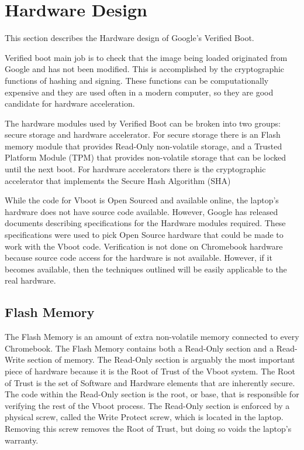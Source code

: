 \chapter{Hardware Design}

This section describes the Hardware design of Google's Verified Boot. 

Verified boot main job is to check that the image being loaded originated from
Google and has not been modified. 
This is accomplished by the cryptographic functions of hashing and signing.
These functions can be computationally expensive and they are used often in a
modern computer, so they are good candidate for hardware acceleration.  

The hardware modules used by Verified Boot can be broken into two groups: secure storage and hardware accelerator.
For secure storage there is an Flash memory module that provides 
Read-Only non-volatile storage, and a Trusted Platform Module (TPM) that provides non-volatile storage that can be locked until the next boot.
For hardware accelerators there is the cryptographic accelerator that
implements the Secure Hash Algorithm (SHA) 

While the code for Vboot is Open Sourced and available online, the laptop's
hardware does not have source code available.
However, Google has released documents describing specifications for the
Hardware modules required. 
These specifications were used to pick Open Source hardware that could be made
to work with the Vboot code. 
Verification is not done on Chromebook hardware because source code access for
the hardware is not available. 
However, if it becomes available, then the techniques outlined will be easily
applicable to the real hardware. 

\section{Flash Memory}\label{flash_mem}

The Flash Memory is an amount of extra non-volatile memory connected to every Chromebook. 
The Flash Memory contains both a Read-Only section and a Read-Write section of memory.
The Read-Only section is arguably the most important piece of hardware because it is the Root of Trust of the Vboot system.
The Root of Trust is the set of Software and Hardware elements that are
inherently secure\cite{RoT}.
The code within the Read-Only section is the root, or base, that is responsible for verifying the rest of the Vboot process.
The Read-Only section is enforced by a physical screw, called the Write Protect screw, which is located in the laptop.
Removing this screw removes the Root of Trust, but doing so voids the laptop's warranty.

